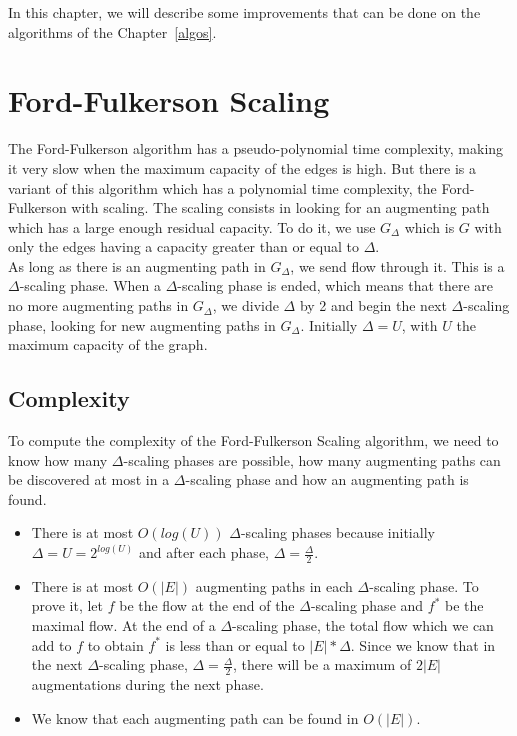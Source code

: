 
In this chapter, we will describe some improvements that can be done on the algorithms of the Chapter~\ref{algos}.

\section{Ford-Fulkerson Scaling}
The Ford-Fulkerson algorithm has a pseudo-polynomial time complexity, making it very slow when the maximum capacity of the edges is high. But there is a variant of this algorithm which has a polynomial time complexity, the Ford-Fulkerson with scaling. The scaling consists in looking for an augmenting path which has a large enough residual capacity. To do it, we use $G_\Delta$ which is $G$ with only the edges having a capacity greater than or equal to $\Delta$. \\

As long as there is an augmenting path in $G_\Delta$, we send flow through it. This is a $\Delta$-scaling phase. When a $\Delta$-scaling phase is ended, which means that there are no more augmenting paths in $G_\Delta$, we divide $\Delta$ by 2 and begin the next $\Delta$-scaling phase, looking for new augmenting paths in $G_\Delta$. Initially $\Delta = U$, with $U$ the maximum capacity of the graph.

\subsection{Complexity}
To compute the complexity of the Ford-Fulkerson Scaling algorithm, we need to know how many $\Delta$-scaling phases are possible, how many augmenting paths can be discovered at most in a $\Delta$-scaling phase and how an augmenting path is found.

\begin{itemize}
\item There is at most $O(log(U))$ $\Delta$-scaling phases because initially $\Delta = U = 2^{log(U)}$ and after each phase, $\Delta=\frac{\Delta}{2}$.
\item There is at most $O(|E|)$ augmenting paths in each $\Delta$-scaling phase. To prove it, let $f$ be the flow at the end of the $\Delta$-scaling phase and $f^*$ be the maximal flow. At the end of a $\Delta$-scaling phase, the total flow which we can add to $f$ to obtain $f^*$ is less than or equal to $|E|*\Delta$. Since we know that in the next $\Delta$-scaling phase, $\Delta=\frac{\Delta}{2}$, there will be a maximum of $2|E|$ augmentations during the next phase.
\item We know that each augmenting path can be found in $O(|E|)$.
\end{itemize}

